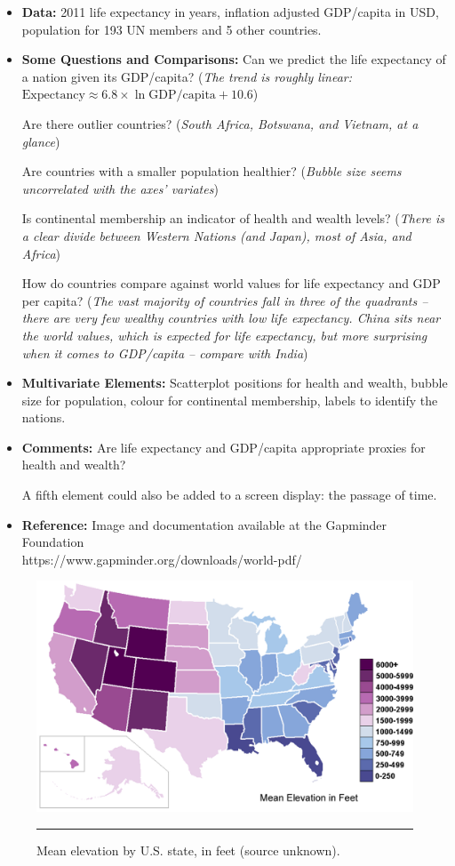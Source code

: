 \begin{itemize}[noitemsep]
\item \textbf{Data:} 2011 life expectancy in years, inflation adjusted GDP/capita in USD, population for 193 UN members and 5 other countries. 
\item \textbf{Some Questions and Comparisons:} Can we predict the life expectancy of a nation given its GDP/capita? (\textit{The trend is roughly linear: $\mbox{Expectancy}\approx 6.8 \times \ln \mbox{GDP/capita} + 10.6$}) \par Are there outlier countries? (\textit{South Africa, Botswana, and Vietnam, at a glance})\par Are countries with a smaller population healthier? (\textit{Bubble size seems uncorrelated with the axes' variates}) \par Is continental membership an indicator of health and wealth levels? (\textit{There is a clear divide between Western Nations (and Japan), most of Asia, and Africa}) \par How do countries  compare against world values for life expectancy and GDP per capita? (\textit{The vast majority of countries fall in three of the quadrants -- there are very few wealthy countries with low life expectancy. China sits near the world values, which is expected for life expectancy, but more surprising when it comes to GDP/capita -- compare with India})   
\item \textbf{Multivariate Elements:} Scatterplot positions for health and wealth, bubble size for population, colour for continental membership, labels to identify the nations. 
\item \textbf{Comments:} Are life expectancy and GDP/capita appropriate proxies for health and wealth? \par A fifth element could also be added to a screen display: the passage of time. 
\item \textbf{Reference:} Image and documentation available at the Gapminder Foundation \\ https://www.gapminder.org/downloads/world-pdf/
\end{itemize}
\newpage
\begin{figure}[t]
\centering
\includegraphics[width=\textwidth]{Images/choropleth.png}
\caption[\small Choropleth Map: mean elevation by U.S. state ]{\small Mean elevation by U.S. state, in feet (source unknown).} \hrule\label{fig:ex_ch_mef}
\end{figure}
